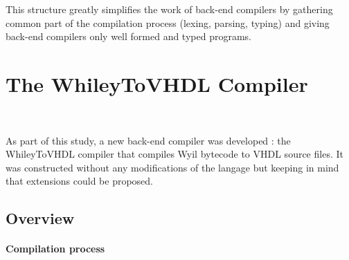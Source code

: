 \documentclass[10pt,a4paper]{article}
\renewcommand{\indent}{~\\\vspace{-.8cm}}
\newcommand{\pindent}{~\\\indent}
\begin{document}
This structure greatly simplifies the work of back-end compilers by gathering common part of the compilation process (lexing, parsing, typing) and giving back-end compilers only well formed and typed programs. 







\newpage
\section{The WhileyToVHDL Compiler}\indent

As part of this study, a new back-end compiler was developed : the WhileyToVHDL compiler that compiles Wyil bytecode to VHDL source files. It was constructed without any modifications of the langage but keeping in mind that extensions could be proposed.

\subsection{Overview}

\paragraph{Compilation process}\pindent

%	
\end{document}
